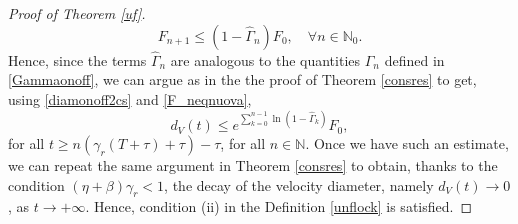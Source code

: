 \documentclass[11pt]{article}
\begin{document}
\begin{proof}[Proof of Theorem \ref{uf}]
    \begin{equation}\label{F_neqnuova}
    F_{n+1}\leq (1-\hat{\Gamma}_n)F_0,\quad \forall n\in \mathbb{N}_0. 
    \end{equation}
    Hence, since the terms $\hat{\Gamma}_n$ are analogous to the quantities $\Gamma_n$ defined in \eqref{Gammaonoff}, we can argue as in the the proof of Theorem \ref{consres} to get, using \eqref{diamonoff2cs} and \eqref{F_neqnuova},
    \begin{equation}\label{decadimento}
    d_V(t)\leq e^{{\sum\limits_{k=0}^{n-1}\ln (1-\hat{\Gamma}_k)}}F_0,
    \end{equation}
    for all $t\geq n(\gamma_r(T+\tau)+\tau)-\tau$, for all $n\in \mathbb{N}$. Once we have such an estimate, we can repeat the same argument in Theorem \ref{consres} to obtain, thanks to the condition $(\eta+\beta)\gamma_r<1$, the decay of the velocity diameter, namely $d_V(t)\to 0$, as $t\to +\infty$. Hence, condition (ii) in the Definition \ref{unflock} is satisfied.


\end{proof}
\end{document}
